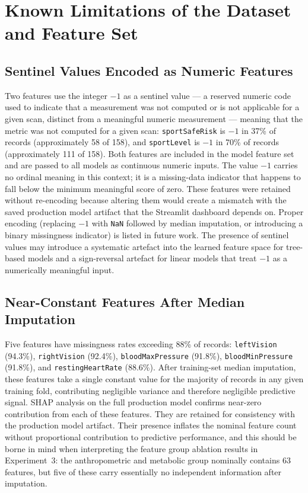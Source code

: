\documentclass[11pt,a4paper]{report}
\begin{document}
\section{Known Limitations of the Dataset and Feature Set}
\label{sec:limitations}

\subsection{Sentinel Values Encoded as Numeric Features}

Two features use the integer $-1$ as a sentinel value --- a reserved numeric code used to indicate that a measurement was not computed or is not applicable for a given scan, distinct from a meaningful numeric measurement --- meaning that the metric was not computed for a given scan: \texttt{sportSafeRisk} is $-1$ in 37\% of records (approximately 58 of 158),
and \texttt{sportLevel} is $-1$ in 70\% of records (approximately 111 of 158). Both features are
included in the model feature set and are passed to all models as continuous numeric inputs. The
value $-1$ carries no ordinal meaning in this context; it is a missing-data indicator that happens
to fall below the minimum meaningful score of zero. These features were retained without
re-encoding because altering them would create a mismatch with the saved production model artifact
that the Streamlit dashboard depends on. Proper encoding (replacing $-1$ with \texttt{NaN}
followed by median imputation, or introducing a binary missingness indicator) is listed in
future work. The presence of sentinel values may introduce a systematic artefact into the learned
feature space for tree-based models and a sign-reversal artefact for linear models that treat
$-1$ as a numerically meaningful input.

\subsection{Near-Constant Features After Median Imputation}

Five features have missingness rates exceeding 88\% of records: \texttt{leftVision} (94.3\%),
\texttt{rightVision} (92.4\%), \texttt{bloodMaxPressure} (91.8\%), \texttt{bloodMinPressure}
(91.8\%), and \texttt{restingHeartRate} (88.6\%). After training-set median imputation, these
features take a single constant value for the majority of records in any given training fold,
contributing negligible variance and therefore negligible predictive signal. SHAP analysis on the
full production model confirms near-zero contribution from each of these features. They are
retained for consistency with the production model artifact. Their presence inflates the nominal
feature count without proportional contribution to predictive performance, and this should be
borne in mind when interpreting the feature group ablation results in Experiment~3: the
anthropometric and metabolic group nominally contains 63 features, but five of these carry
essentially no independent information after imputation.
\end{document}
